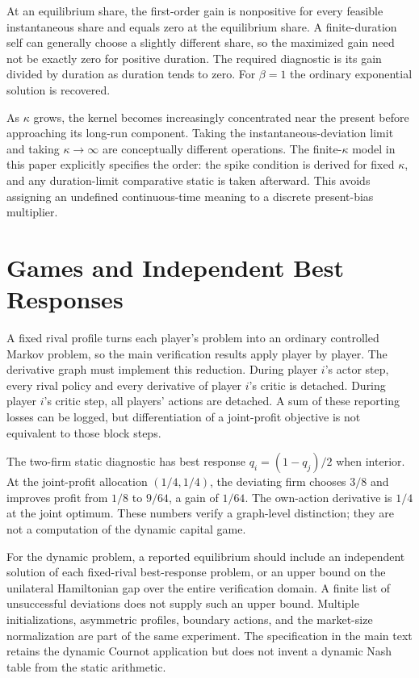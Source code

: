 \documentclass[ecta,draft]{econsocart}
\begin{document}
At an equilibrium share, the first-order gain is nonpositive for every feasible instantaneous share and equals zero at the equilibrium share. A finite-duration self can generally choose a slightly different share, so the maximized gain need not be exactly zero for positive duration. The required diagnostic is its gain divided by duration as duration tends to zero. For $\beta=1$ the ordinary exponential solution is recovered.

As $\kappa$ grows, the kernel becomes increasingly concentrated near the present before approaching its long-run component. Taking the instantaneous-deviation limit and taking $\kappa\to\infty$ are conceptually different operations. The finite-$\kappa$ model in this paper explicitly specifies the order: the spike condition is derived for fixed $\kappa$, and any duration-limit comparative static is taken afterward. This avoids assigning an undefined continuous-time meaning to a discrete present-bias multiplier.

\section{Games and Independent Best Responses}
A fixed rival profile turns each player's problem into an ordinary controlled Markov problem, so the main verification results apply player by player. The derivative graph must implement this reduction. During player $i$'s actor step, every rival policy and every derivative of player $i$'s critic is detached. During player $i$'s critic step, all players' actions are detached. A sum of these reporting losses can be logged, but differentiation of a joint-profit objective is not equivalent to those block steps.

The two-firm static diagnostic has best response $q_i=(1-q_j)/2$ when interior. At the joint-profit allocation $(1/4,1/4)$, the deviating firm chooses $3/8$ and improves profit from $1/8$ to $9/64$, a gain of $1/64$. The own-action derivative is $1/4$ at the joint optimum. These numbers verify a graph-level distinction; they are not a computation of the dynamic capital game.

For the dynamic problem, a reported equilibrium should include an independent solution of each fixed-rival best-response problem, or an upper bound on the unilateral Hamiltonian gap over the entire verification domain. A finite list of unsuccessful deviations does not supply such an upper bound. Multiple initializations, asymmetric profiles, boundary actions, and the market-size normalization are part of the same experiment. The specification in the main text retains the dynamic Cournot application but does not invent a dynamic Nash table from the static arithmetic.
\end{document}
